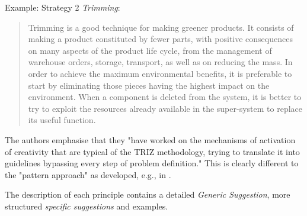 \documentclass[11pt,a4paper]{article}
\begin{document}
Example: Strategy 2 \emph{Trimming}:
\begin{quote}
  Trimming is a good technique for making greener products. It consists of
  making a product constituted by fewer parts, with positive consequences on
  many aspects of the product life cycle, from the management of warehouse
  orders, storage, transport, as well as on reducing the mass. In order to
  achieve the maximum environmental benefits, it is preferable to start by
  eliminating those pieces having the highest impact on the environment. When
  a component is deleted from the system, it is better to try to exploit the
  resources already available in the super-system to replace its useful
  function.
\end{quote}

The authors emphasise that they "have worked on the mechanisms of activation
of creativity that are typical of the TRIZ methodology, trying to translate it
into guidelines bypassing every step of problem definition." This is clearly
different to the "pattern approach" as developed, e.g., in \cite{LF2018}.

The description of each principle contains a detailed \emph{Generic
  Suggestion}, more structured \emph{specific suggestions} and examples.
\end{document}
